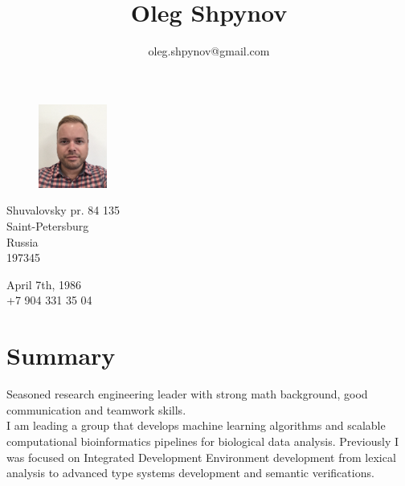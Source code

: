\documentclass[11pt]{article}
\title{\bfseries\Huge Oleg Shpynov}
\author{oleg.shpynov@gmail.com}
\date{}
\begin{document}
\begin{figure}
    \vspace*{-4cm} %
	\hfill\includegraphics[width=0.20\textwidth]{me2020.png}
    \vspace*{-4cm} %
\end{figure}

\maketitle 

\begin{minipage}[ht]{0.4\textwidth}
Shuvalovsky pr. 84 135\\
Saint-Petersburg\\
Russia\\
197345
\end{minipage}
\begin{minipage}[ht]{0.3\textwidth}
April 7th, 1986\\
+7 904 331 35 04
\end{minipage}
\vspace{10pt}

\section*{Summary}
Seasoned research engineering leader with strong math background, good communication and teamwork skills.\\
I am leading a group that develops machine learning algorithms and scalable computational  bioinformatics pipelines for biological data analysis. Previously I was focused on Integrated Development Environment development from lexical analysis to advanced type systems development and semantic verifications.

\end{document}
